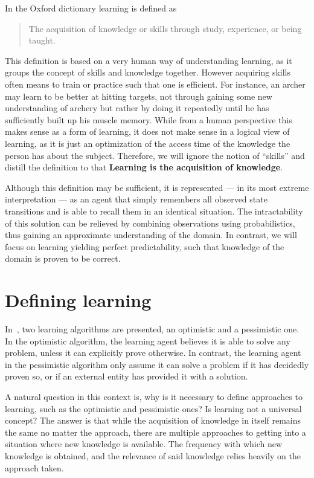 \documentclass[\master/Master.tex]{subfiles}
\begin{document}
	In the Oxford dictionary learning is defined as
	\begin{quote}
		The acquisition of knowledge or skills through study, experience, or being taught.
	\end{quote}
	
	This definition is based on a very human way of understanding learning, as it groups the concept of skills and knowledge together.
	However acquiring skills often means to train or practice such that one is efficient. For instance, an archer may learn to be better at hitting targets, 
	not through gaining some new understanding of archery but rather by doing it repeatedly until he has sufficiently built up his muscle memory.
	While from a human perspective this makes sense as a form of learning, 
	it does not make sense in a logical view of learning, as it is just an optimization of the access time of the knowledge the person has about the subject.
    Therefore, we will ignore the notion of ``skills'' and distill the definition to that \textbf{Learning is the acquisition of knowledge}.
    
    Although this definition may be sufficient, it is represented --- in its most extreme interpretation --- as an agent that simply remembers all observed state transitions and is able to recall them in an identical situation. The intractability of this solution can be relieved by combining observations using probabilistics, thus gaining an approximate understanding of the domain. In contrast, we will focus on learning yielding perfect predictability, such that knowledge of the domain is proven to be correct.

\section{Defining learning}
	
	In~\cite{Walsh2008}, two learning algorithms are presented, an optimistic and a pessimistic one.
    In the optimistic algorithm, the learning agent believes it is able to solve any problem, unless it can explicitly prove otherwise. In contrast, the learning agent in the pessimistic algorithm only assume it can solve a problem if it has decidedly proven so, or if an external entity has provided it with a solution. 

A natural question in this context is, why is it necessary to define approaches to learning, such as the optimistic and pessimistic ones? Is learning not a universal concept? The answer is that while the acquisition of knowledge in itself remains the same no matter the approach, there are multiple approaches to getting into a situation where new knowledge is available. The frequency with which new knowledge is obtained, and the relevance of said knowledge relies heavily on the approach taken.
\end{document}
